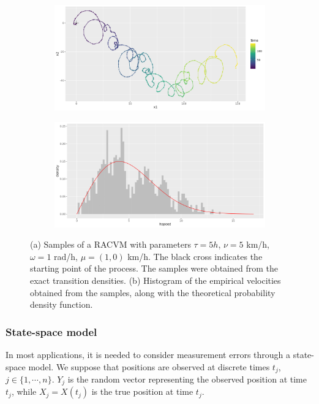 \documentclass[11pt]{article}
\newcommand {\1}{\mathbb{1}}
\begin{document}

\begin{figure}[H]
	\centering
	\begin{subfigure}{0.48\textwidth}
		\centering
		\includegraphics[scale=0.3]{images/rcvm/tau5_nu5_omega1mu11_sigmaobs0.03 .png}
		\caption{}
	\end{subfigure}
	\begin{subfigure}{0.48\textwidth}
		\centering
		\includegraphics[scale=0.3]{images/rcvm/hspeed_histo_tau5_nu5omega1_mu11_sigmaobs0.03 .png}
		\caption{}
	\end{subfigure}
	\caption{(a) Samples of a RACVM with parameters $\tau=5 h$, $\nu=5$ km/h,$\omega=1$ rad/h, $\mu=(1,0)$ km/h. The black cross indicates the starting point of the process. The samples were obtained from the exact transition densities. (b) Histogram of the empirical velocities obtained from the samples, along with the theoretical probability density function.}
	\label{fig: sample RACVM}
\end{figure}


\subsubsection{State-space model}
In most applications, it is needed to consider measurement errors through a state-space model. We suppose that positions are observed at discrete times $t_j$, $j \in \{1,\cdots, n\}$. $Y_j$ is the random vector representing the observed position at time $t_j$, while $X_j=X(t_j)$ is the true position at time $t_j$.
\end{document}
